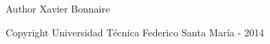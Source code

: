 \begin{DoxyAuthor}{Author}
Xavier Bonnaire 
\end{DoxyAuthor}
\begin{DoxyCopyright}{Copyright}
Universidad Técnica Federico Santa María -\/ 2014 
\end{DoxyCopyright}
